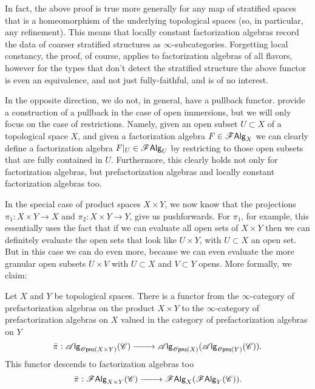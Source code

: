 \documentclass[../text]{subfiles}
\begin{document}
\begin{remark}
    In fact, the above proof is true more generally for any map of stratified spaces that is a homeomorphism of the underlying topological spaces (so, in particular, any refinement). This means that locally constant factorization algebras record the data of coarser stratified structures as $\infty$-subcategories. Forgetting local constancy, the proof, of course, applies to factorization algebras of all flavors, however for the types that don't detect the stratified structure the above functor is even an equivalence, and not just fully-faithful, and is of no interest.
\end{remark}


In the opposite direction, we do not, in general, have a pullback functor. \cite{cg2016} provide a construction of a pullback in the case of open immersions, but we will only focus on the case of restrictions. Namely, given an open subset $U \subset X$ of a topological space $X$, and given a factorization algebra $F \in \mathscr{F} \mathsf{Alg}_X$ we can clearly define a factorization algebra $F|_{U} \in \mathscr{F} \mathsf{Alg}_U$ by restricting to those open subsets that are fully contained in $U$. Furthermore, this clearly holds not only for factorization algebras, but prefactorization algebras and locally constant factorization algebras too.

In the special case of product spaces $X \times Y$, we now know that the projections $\pi_1: X \times Y \rightarrow X$ and $\pi_2: X \times Y \rightarrow Y$, give us pushforwards. For $\pi_1$, for example, this essentially uses the fact that if we can evaluate all open sets of $X \times Y$ then we can definitely evaluate the open sets that look like $U \times Y$, with $U \subset X$ an open set. But in this case we can do even more, because we can even evaluate the more granular open subsets $U \times V$ with $U \subset X$ and $V \subset Y$ opens. More formally, we claim:
%
\begin{proposition}\label{prop:exp_of_products}
    Let $X$ and $Y$ be topological spaces. There is a functor from the $\infty$-category of prefactorization algebras on the product $X \times Y$ to the $\infty$-category of prefactorization algebras on $X$ valued in the category of prefactorization algebras on $Y$
    \begin{equation}
        \bar{\pi}: \alg{\opens(X \times Y)}(\catC) \xrightarrow{\qquad} \alg{\opens(X)} (\alg{\opens(Y)} (\catC)).
    \end{equation}
    This functor descends to factorization algebras too
    \begin{equation}
        \bar{\pi}: \mathscr{F} \mathsf{Alg}_{X \times Y}(\mathscr{C}) \xrightarrow{\qquad} \mathscr{F} \mathsf{Alg}_{X}(\mathscr{F} \mathsf{Alg}_{Y}(\mathscr{C})).
    \end{equation}
\end{proposition}
\end{document}
